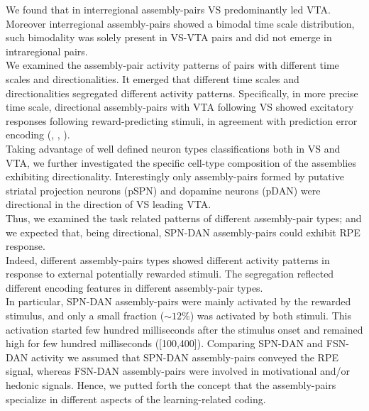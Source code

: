 We found that in interregional assembly-pairs VS predominantly led VTA. Moreover interregional assembly-pairs showed a bimodal time scale distribution, such bimodality was solely present in VS-VTA pairs and did not emerge in intraregional pairs.\\We examined the assembly-pair activity patterns of pairs with different time scales and directionalities. It emerged that different time scales and directionalities segregated different activity patterns. Specifically, in more precise time scale, directional assembly-pairs with VTA following VS showed excitatory responses following reward-predicting stimuli, in agreement with prediction error encoding (\cite{Tobler2003}, \cite{Nomoto2010}, \cite{Schultz2016}).\\Taking advantage of well defined neuron types classifications both in VS and VTA, we further investigated the specific cell-type composition of the assemblies exhibiting directionality. Interestingly only assembly-pairs formed by putative striatal projection neurons (pSPN) and dopamine neurons (pDAN) were directional in the direction of VS leading VTA.\\Thus, we examined the task related patterns of different assembly-pair types; and we expected that, being directional, SPN-DAN assembly-pairs could exhibit RPE response.\\Indeed, different assembly-pairs types showed different activity patterns in response to external potentially rewarded stimuli. The segregation reflected different encoding features in different assembly-pair types.\\In particular, SPN-DAN assembly-pairs were mainly activated by the rewarded stimulus, and only a small fraction ($\sim12\%$) was activated by both stimuli. This activation started few hundred milliseconds after the stimulus onset and remained high for few hundred milliseconds ([100,400]). Comparing SPN-DAN and FSN-DAN activity we assumed that SPN-DAN assembly-pairs conveyed the RPE signal, whereas FSN-DAN assembly-pairs were involved in motivational and/or hedonic signals. Hence, we putted forth the concept that the assembly-pairs specialize in different aspects of the learning-related coding.\\%
